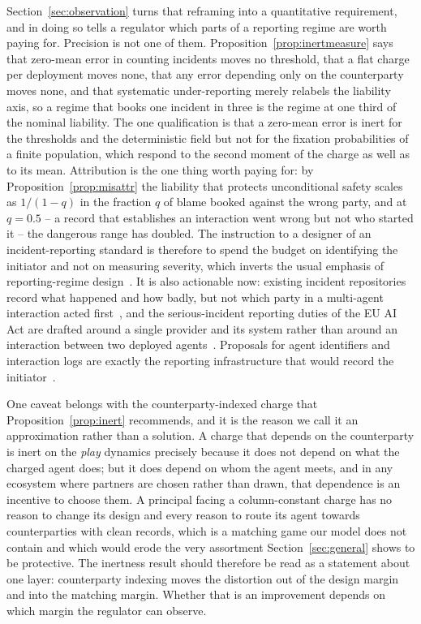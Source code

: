 \documentclass[11pt,a4paper]{article}
\theoremstyle{definition}
\begin{document}
Section~\ref{sec:observation} turns that reframing into a quantitative
requirement, and in doing so tells a regulator which parts of a reporting
regime are worth paying for. Precision is not one of them.
Proposition~\ref{prop:inertmeasure} says that zero-mean error in counting
incidents moves no threshold, that a flat charge per deployment moves none,
that any error depending only on the counterparty moves none, and that
systematic under-reporting merely relabels the liability axis, so a regime
that books one incident in three is the regime at one third of the nominal
liability. The one qualification is that a zero-mean error is inert for the
thresholds and the deterministic field but not for the fixation probabilities
of a finite population, which respond to the second moment of the charge as
well as to its mean. Attribution is the one thing worth paying
for: by Proposition~\ref{prop:misattr} the liability that protects
unconditional safety scales as $1/(1-q)$ in the fraction $q$ of blame booked
against the wrong party, and at $q=0.5$ -- a record that establishes an
interaction went wrong but not who started it -- the dangerous range has
doubled. The instruction to a designer of an incident-reporting standard is
therefore to spend the budget on identifying the initiator and not on
measuring severity, which inverts the usual emphasis of reporting-regime
design~\citep{dixon2024hybrid}. It is also actionable
now: existing incident repositories record what happened and how badly, but
not which party in a multi-agent interaction acted
first~\citep{mcgregor2021incident}, and the serious-incident reporting duties
of the EU AI Act are drafted around a single provider and its system rather
than around an interaction between two deployed
agents~\citep{euaiact2024,buiten2023liability}. Proposals for agent
identifiers and interaction logs are exactly the reporting infrastructure that
would record the
initiator~\citep{shavit2023practices,chan2024visibility,chan2024ids}.

One caveat belongs with the counterparty-indexed charge that
Proposition~\ref{prop:inert} recommends, and it is the reason we call it an
approximation rather than a solution. A charge that depends on the counterparty
is inert on the \emph{play} dynamics precisely because it does not depend on
what the charged agent does; but it does depend on whom the agent meets, and
in any ecosystem where partners are chosen rather than drawn, that dependence
is an incentive to choose them. A principal facing a column-constant charge
has no reason to change its design and every reason to route its agent towards
counterparties with clean records, which is a matching game our model does not
contain and which would erode the very assortment
Section~\ref{sec:general} shows to be protective. The inertness result should
therefore be read as a statement about one layer: counterparty indexing moves
the distortion out of the design margin and into the matching margin. Whether
that is an improvement depends on which margin the regulator can observe.
\end{document}
